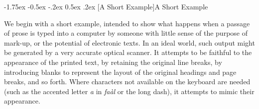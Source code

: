 \documentclass[11pt,twoside]{article}\makeatletter
\makeatletter
\renewcommand\section{\@startsection {section}{1}{\z@}%
     {-1.75ex \@plus -0.5ex \@minus -.2ex}%
     {0.5ex \@plus .2ex}%
     {\reset@font\Large\bfseries\sffamily}}
\makeatother
\begin{document}
\section[{A Short Example}]{A Short Example}\label{U5-eg}\par
We begin with a short example, intended to show what happens when a passage of prose is typed into a computer by someone with little sense of the purpose of mark-up, or the potential of electronic texts. In an ideal world, such output might be generated by a very accurate optical scanner. It attempts to be faithful to the appearance of the printed text, by retaining the original line breaks, by introducing blanks to represent the layout of the original headings and page breaks, and so forth. Where characters not available on the keyboard are needed (such as the accented letter \textit{a} in \textit{faàl} or the long dash), it attempts to mimic their appearance.\par
\end{document}
